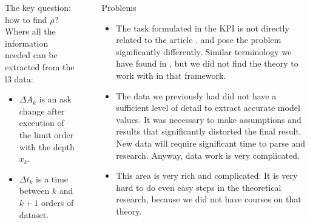 \documentclass[]{beamer}
\begin{document}
\begin{frame}[t]
\begin{columns}[t]
\begin{column}{\onecolwid}
\begin{block}{The key question: how to find $\rho$?}
        Where all the information needed can be extracted from the l3 data: 
        \begin{itemize}
            \item $\Delta A_{k}$ is an ask change after execution of the limit order with the depth $x_k$.
            \item $\Delta t_{k}$ is a time between $k$ and $k + 1$ orders of dataset.
        \end{itemize}
    \end{block}

   
    
    \end{column}
    
    
    \begin{column}{\sepwid}\end{column} %
    
    \begin{column}{\onecolwid} %
    
        
        \begin{block}{Problems}
            \begin{itemize}
                \item The task formulated in the KPI is not directly related to the article \cite{obizhaeva2013optimal}. 
                \cite{obizhaeva2013optimal} and \cite{velu2020algorithmic} pose 
                the problem significantly differently. Similar terminology we have found in \cite{webster2023handbook}, but 
                we did not find the theory to work with in that framework.
                \item The data we previously had did not have a sufficient level of detail to extract accurate model values. 
                It was necessary to make assumptions and results that significantly distorted the final result. 
                New data will require significant time to parse and research. Anyway, data work is very complicated.
                \item This area is very rich and complicated. It is very hard to do even easy steps in the theoretical research, 
                because we did not have courses on that theory. 
                

\end{itemize}
\end{block}
\end{column}
\end{columns}
\end{frame}
\end{document}
